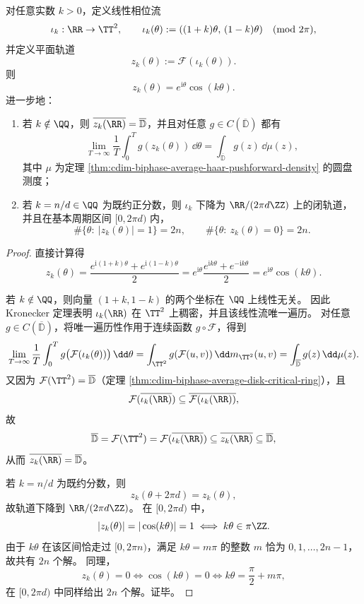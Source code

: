\begin{theorem}[玫瑰轨道作为双相位平均门的一维子流限制]\label{thm:cdim-rhodonea-as-biphase-average-subflow}
对任意实数 \(k>0\)，定义线性相位流
\[
\iota_k:\RR\to\TT^2,
\qquad
\iota_k(\theta):=((1+k)\theta,\,(1-k)\theta)\quad (\mathrm{mod}\ 2\pi),
\]
并定义平面轨道
\[
z_k(\theta):=\mathcal F(\iota_k(\theta)).
\]
则
\[
z_k(\theta)=e^{\mathrm{i}\theta}\cos(k\theta).
\]
进一步地：
\begin{enumerate}
  \item 若 \(k\notin\QQ\)，则 \(\overline{z_k(\RR)}=\overline{\mathbb D}\)，并且对任意 \(g\in C(\overline{\mathbb D})\) 都有
  \[
  \lim_{T\to\infty}\frac{1}{T}\int_0^T g(z_k(\theta))\,\dd\theta
  =
  \int_{\overline{\mathbb D}} g(z)\,\dd\mu(z),
  \]
  其中 \(\mu\) 为定理 \ref{thm:cdim-biphase-average-haar-pushforward-density} 的圆盘测度；
  \item 若 \(k=n/d\in\QQ\) 为既约正分数，则 \(\iota_k\) 下降为 \(\RR/(2\pi d\ZZ)\) 上的闭轨道，并且在基本周期区间 \([0,2\pi d)\) 内，
  \[
  \#\{\theta:\ |z_k(\theta)|=1\}=2n,
  \qquad
  \#\{\theta:\ z_k(\theta)=0\}=2n.
  \]
\end{enumerate}
\end{theorem}
\begin{proof}
直接计算得
\[
z_k(\theta)
=
\frac{e^{\mathrm{i}(1+k)\theta}+e^{\mathrm{i}(1-k)\theta}}{2}
=
e^{\mathrm{i}\theta}\frac{e^{\mathrm{i}k\theta}+e^{-\mathrm{i}k\theta}}{2}
=
e^{\mathrm{i}\theta}\cos(k\theta).
\]

若 \(k\notin\QQ\)，则向量 \((1+k,1-k)\) 的两个坐标在 \(\QQ\) 上线性无关。
因此 Kronecker 定理表明 \(\iota_k(\RR)\) 在 \(\TT^2\) 上稠密，并且该线性流唯一遍历。
对任意 \(g\in C(\overline{\mathbb D})\)，将唯一遍历性作用于连续函数 \(g\circ\mathcal F\)，得到
\[
\lim_{T\to\infty}\frac{1}{T}\int_0^T g\bigl(\mathcal F(\iota_k(\theta))\bigr)\,\dd\theta
=
\int_{\TT^2} g(\mathcal F(u,v))\,\dd m_{\TT^2}(u,v)
=
\int_{\overline{\mathbb D}} g(z)\,\dd\mu(z).
\]
又因为 \(\mathcal F(\TT^2)=\overline{\mathbb D}\)（定理 \ref{thm:cdim-biphase-average-disk-critical-ring}），且
\[
\mathcal F(\overline{\iota_k(\RR)})\subseteq \overline{\mathcal F(\iota_k(\RR))},
\]
故
\[
\overline{\mathbb D}
=
\mathcal F(\TT^2)
=
\mathcal F(\overline{\iota_k(\RR)})
\subseteq
\overline{z_k(\RR)}
\subseteq
\overline{\mathbb D},
\]
从而 \(\overline{z_k(\RR)}=\overline{\mathbb D}\)。

若 \(k=n/d\) 为既约分数，则
\[
z_k(\theta+2\pi d)=z_k(\theta),
\]
故轨道下降到 \(\RR/(2\pi d\ZZ)\)。
在 \([0,2\pi d)\) 中，
\[
|z_k(\theta)|=|\cos(k\theta)|=1
\iff
k\theta\in\pi\ZZ.
\]
由于 \(k\theta\) 在该区间恰走过 \([0,2\pi n)\)，满足 \(k\theta=m\pi\) 的整数 \(m\) 恰为 \(0,1,\dots,2n-1\)，故共有 \(2n\) 个解。
同理，
\[
z_k(\theta)=0
\iff
\cos(k\theta)=0
\iff
k\theta=\frac{\pi}{2}+m\pi,
\]
在 \([0,2\pi d)\) 中同样给出 \(2n\) 个解。证毕。
\end{proof}

